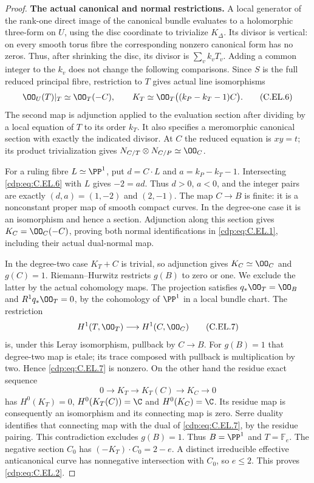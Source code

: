 \begin{proof}
\par\medskip\noindent\textbf{The actual canonical and normal restrictions.}
A local generator of the rank-one direct image of the canonical
bundle evaluates to a holomorphic three-form on $U$, using the
disc coordinate to trivialize $K_\Delta$. Its divisor is vertical:
on every smooth torus fibre the corresponding nonzero canonical
form has no zeros. Thus, after shrinking the disc, its divisor
is $\sum_v k_vT_v$. Adding a common integer to the $k_v$ does not
change the following comparisons. Since $S$ is the full reduced
principal fibre, restriction to $T$ gives actual line isomorphisms
\[
 \OO_U(T)|_T\simeq\OO_T(-C),\qquad
 K_T\simeq\OO_T\bigl((k_P-k_T-1)C\bigr).
                                                        \tag{C.EL.6}\label{cdp:eq:C.EL.6}
\]
The second map is adjunction applied to the evaluation section
after dividing by a local equation of $T$ to its order $k_T$.
It also specifies a meromorphic canonical section with exactly
the indicated divisor. At $C$ the reduced equation is $xy=t$;
its product trivialization gives
$N_{C/T}\otimes N_{C/P}\simeq\OO_C$.

For a ruling fibre $L\simeq\PP^1$, put $d=C\cdot L$ and
$a=k_P-k_T-1$. Intersecting \eqref{cdp:eq:C.EL.6} with $L$ gives
$-2=ad$. Thus $d>0$, $a<0$, and the integer pairs are exactly
$(d,a)=(1,-2)$ and $(2,-1)$. The map $C\to B$ is finite:
it is a nonconstant proper map of smooth compact curves. In the
degree-one case it is an isomorphism and hence a section.
Adjunction along this section gives
$K_C=\OO_C(-C)$, proving both normal identifications in
\eqref{cdp:eq:C.EL.1}, including their actual dual-normal map.

In the degree-two case $K_T+C$ is trivial, so adjunction gives
$K_C\simeq\OO_C$ and $g(C)=1$. Riemann--Hurwitz restricts
$g(B)$ to zero or one. We exclude the latter by the actual
cohomology maps. The projection satisfies
$q_*\OO_T=\OO_B$ and $R^1q_*\OO_T=0$, by the cohomology of
$\PP^1$ in a local bundle chart. The restriction
\[
 H^1(T,\OO_T)\longrightarrow H^1(C,\OO_C)
                                                        \tag{C.EL.7}\label{cdp:eq:C.EL.7}
\]
is, under this Leray isomorphism, pullback by $C\to B$.
For $g(B)=1$ that degree-two map is etale; its trace composed
with pullback is multiplication by two. Hence \eqref{cdp:eq:C.EL.7} is
nonzero. On the other hand the residue exact sequence
\[
 0\longrightarrow K_T\longrightarrow K_T(C)
       \longrightarrow K_C\longrightarrow0
                                                        \tag{C.EL.8}\label{cdp:eq:C.EL.8}
\]
has $H^0(K_T)=0$, $H^0(K_T(C))=\C$ and $H^0(K_C)=\C$.
Its residue map is consequently an isomorphism and its
connecting map is zero. Serre duality identifies that connecting
map with the dual of \eqref{cdp:eq:C.EL.7}, by the residue pairing. This
contradiction excludes $g(B)=1$. Thus $B=\PP^1$ and
$T=\mathbb F_e$. The negative section $C_0$ has
$(-K_T)\cdot C_0=2-e$. A distinct irreducible effective
anticanonical curve has nonnegative intersection with $C_0$,
so $e\le2$. This proves \eqref{cdp:eq:C.EL.2}.


\end{proof}
